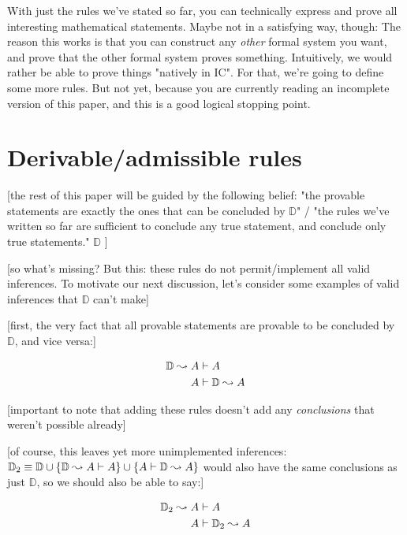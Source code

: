 \documentclass{article}
\begin{document}
  With just the rules we've stated so far, you can technically express and prove all interesting mathematical statements. Maybe not in a satisfying way, though: The reason this works is that you can construct any \emph{other} formal system you want, and prove that the other formal system proves something. Intuitively, we would rather be able to prove things "natively in IC". For that, we're going to define some more rules. But not yet, because you are currently reading an incomplete version of this paper, and this is a good logical stopping point.
  
  \section{Derivable/admissible rules}
  
  \newcommand{\deduction}{\mathbb{D}}
  [the rest of this paper will be guided by the following belief: "the provable statements are exactly the ones that can be concluded by $\deduction$" / "the rules we've written so far are sufficient to conclude any true statement, and conclude only true statements." $\deduction$ ]
  
  [so what's missing? But this: these rules do not permit/implement all valid inferences. To motivate our next discussion, let's consider some examples of valid inferences that $\deduction$ can't make]
  
  [first, the very fact that all provable statements are provable to be concluded by $\deduction$, and vice versa:]
  
  \begin{align*}
    \deduction \concludes A &\vdash A\\
    A &\vdash \deduction \concludes A\\
  \end{align*}
  
  [important to note that adding these rules doesn't add any \emph{conclusions} that weren't possible already]
  
  [of course, this leaves yet more unimplemented inferences: $\deduction_2 \equiv \deduction \union \singleton{\deduction \concludes A \vdash A} \union \singleton{A \vdash \deduction \concludes A}$ would also have the same conclusions as just $\deduction$, so we should also be able to say:]
  
  \begin{align*}
    \deduction_2 \concludes A &\vdash A\\
    A &\vdash \deduction_2 \concludes A\\
  \end{align*}
   
\end{document}
